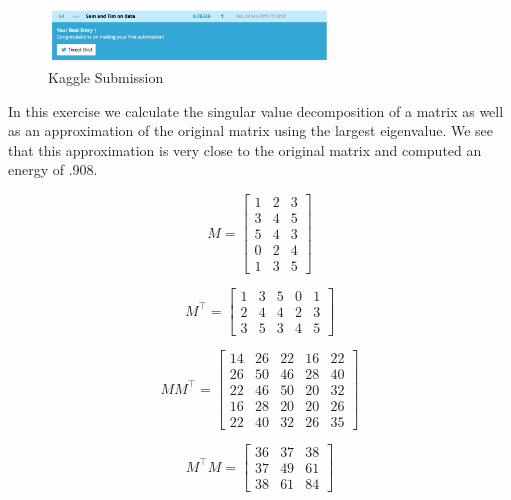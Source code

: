\documentclass[12pt]{report}
\begin{document}
\begin{figure}
\centering
  \includegraphics[width=75mm]{figures/kaggle.png}
\caption{Kaggle Submission}
\end{figure}

\hspace{3mm}


In this exercise we calculate the singular value decomposition of a matrix as well as an approximation of the original matrix using the largest eigenvalue. We see that this approximation is very close to the original matrix and computed an energy of .908.

\[
M =
\begin{bmatrix}
1 & 2 & 3 \\
3 & 4 & 5 \\
5 & 4 & 3 \\
0 & 2 & 4 \\
1 & 3 & 5
\end{bmatrix}
\]


\[
M^\intercal =
\begin{bmatrix}
1 & 3 & 5 & 0 & 1 \\
2 & 4 & 4 & 2 & 3 \\
3 & 5 & 3 & 4 & 5 
\end{bmatrix}
\]

\[
MM^\intercal =
\begin{bmatrix}
14 & 26 & 22 & 16 & 22 \\
26 & 50 & 46 & 28 & 40 \\
22 & 46 & 50 & 20 & 32 \\
16 & 28 & 20 & 20 & 26 \\
22 & 40 & 32 & 26 & 35
\end{bmatrix}
\]

\[
M^\intercal M =
\begin{bmatrix}
36 & 37 & 38 \\ 
37 & 49 & 61 \\
38 & 61 & 84
\end{bmatrix}
\]
\end{document}
